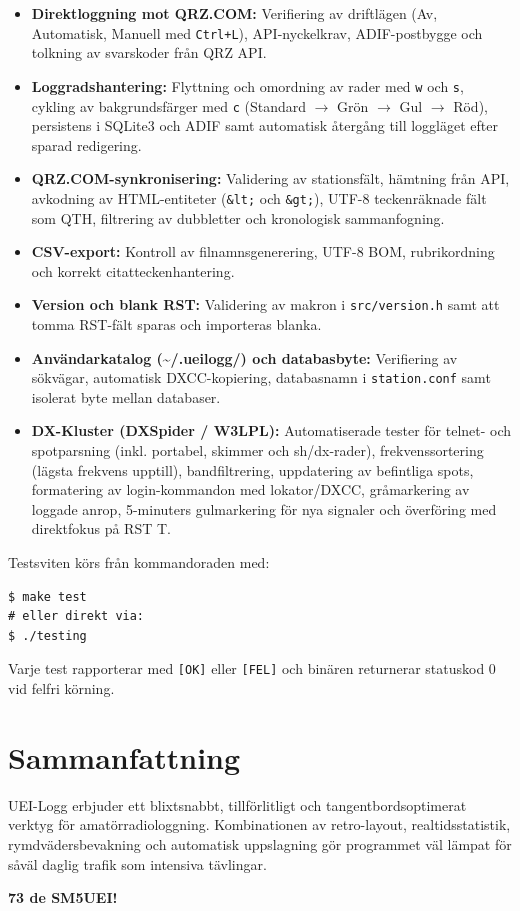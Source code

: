 \documentclass[11pt,a4paper]{article}
\begin{document}
\begin{itemize}
    \item \textbf{Direktloggning mot QRZ.COM:} Verifiering av driftlägen (Av, Automatisk, Manuell med \texttt{Ctrl+L}), API-nyckelkrav, ADIF-postbygge och tolkning av svarskoder från QRZ API.
    \item \textbf{Loggradshantering:} Flyttning och omordning av rader med \texttt{w} och \texttt{s}, cykling av bakgrundsfärger med \texttt{c} (Standard $\rightarrow$ Grön $\rightarrow$ Gul $\rightarrow$ Röd), persistens i SQLite3 och ADIF samt automatisk återgång till loggläget efter sparad redigering.
    \item \textbf{QRZ.COM-synkronisering:} Validering av stationsfält, hämtning från API, avkodning av HTML-entiteter (\texttt{\&lt;} och \texttt{\&gt;}), UTF-8 teckenräknade fält som QTH, filtrering av dubbletter och kronologisk sammanfogning.
    \item \textbf{CSV-export:} Kontroll av filnamnsgenerering, UTF-8 BOM, rubrikordning och korrekt citatteckenhantering.
    \item \textbf{Version och blank RST:} Validering av makron i \texttt{src/version.h} samt att tomma RST-fält sparas och importeras blanka.
    \item \textbf{Användarkatalog (\textasciitilde/.ueilogg/) och databasbyte:} Verifiering av sökvägar, automatisk DXCC-kopiering, databasnamn i \texttt{station.conf} samt isolerat byte mellan databaser.
    \item \textbf{DX-Kluster (DXSpider / W3LPL):} Automatiserade tester för telnet- och spotparsning (inkl. portabel, skimmer och sh/dx-rader), frekvenssortering (lägsta frekvens upptill), bandfiltrering, uppdatering av befintliga spots, formatering av login-kommandon med lokator/DXCC, gråmarkering av loggade anrop, 5-minuters gulmarkering för nya signaler och överföring med direktfokus på RST T.
\end{itemize}

Testsviten körs från kommandoraden med:
\begin{verbatim}
$ make test
# eller direkt via:
$ ./testing
\end{verbatim}
Varje test rapporterar med \texttt{[OK]} eller \texttt{[FEL]} och binären returnerar statuskod 0 vid felfri körning.

\section{Sammanfattning}
\label{sec:summary}

UEI-Logg erbjuder ett blixtsnabbt, tillförlitligt och tangentbordsoptimerat verktyg för amatörradiologgning. Kombinationen av retro-layout, realtidsstatistik, rymdvädersbevakning och automatisk uppslagning gör programmet väl lämpat för såväl daglig trafik som intensiva tävlingar.

\vspace{1cm}
\begin{center}
\textbf{73 de SM5UEI!}
\end{center}
\end{document}
